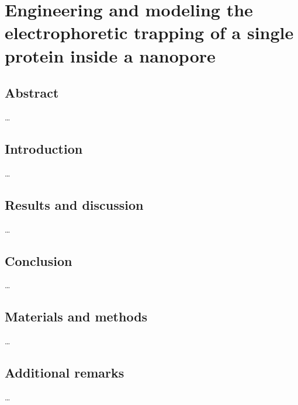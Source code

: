 \chapter{Engineering and modeling the electrophoretic trapping of a single protein inside a nanopore}\label{ch:trapping}

\section{Abstract}
\ldots
\section{Introduction}
\ldots
\section{Results and discussion}
\ldots
\section{Conclusion}
\ldots
\section{Materials and methods}
\ldots
\section{Additional remarks}
\ldots




\cleardoublepage


